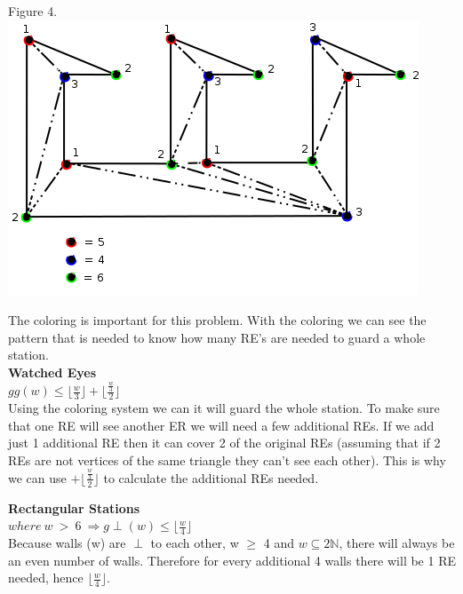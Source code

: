 \documentclass[10pt,a4paper]{report}
\begin{document}
	\begin{center}
		Figure 4.\\
		\includegraphics[scale=.5]{e3.png}
		\newline
		\newline
	\end{center}
	
	The coloring is important for this problem.  With the coloring we can see the pattern that is needed to know how many RE's are needed to guard a whole station.\\
	
	\textbf{Watched Eyes}\\
	$gg(w) \leq \lfloor \frac{w}{3} \rfloor + \lfloor \frac{\frac{w}{3}}{2} \rfloor$\\
	Using the coloring system we can it will guard the whole station.  To make sure that one RE will see another ER we will need a few additional REs.  If we add just 1 additional RE then it can cover 2 of the original REs (assuming that if 2 REs are not vertices of the same triangle they can't see each other). This is why we can use $+ \lfloor \frac{\frac{w}{3}}{2} \rfloor$ to calculate the additional REs needed.  
	
	\textbf{Rectangular Stations}\\
	$where\ w\ >\ 6\ \Longrightarrow g\perp(w) \leq \lfloor \frac{w}{4} \rfloor$\\
	Because walls (w) are $\perp$ to each other, w $\geq$ 4 and $w \subseteq 2\mathbb{N}$, there will always be an even number of walls.  Therefore for every additional 4 walls there will be 1 RE needed, hence $\lfloor \frac{w}{4} \rfloor$.\\
	
\end{document}
